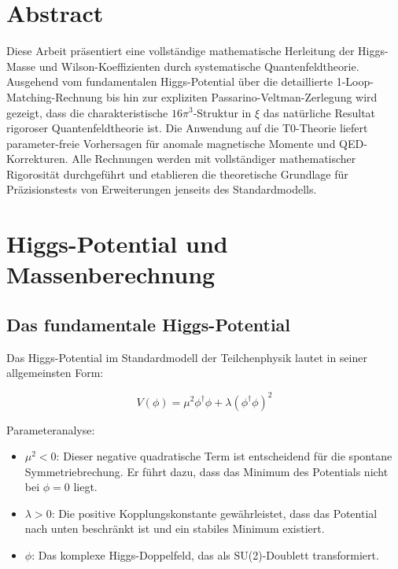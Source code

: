\section*{Abstract}
		Diese Arbeit präsentiert eine vollständige mathematische Herleitung der Higgs-Masse und Wilson-Koeffizienten durch systematische Quantenfeldtheorie. Ausgehend vom fundamentalen Higgs-Potential über die detaillierte 1-Loop-Matching-Rechnung bis hin zur expliziten Passarino-Veltman-Zerlegung wird gezeigt, dass die charakteristische $16\pi^3$-Struktur in $\xi$ das natürliche Resultat rigoroser Quantenfeldtheorie ist. Die Anwendung auf die T0-Theorie liefert parameter-freie Vorhersagen für anomale magnetische Momente und QED-Korrekturen. Alle Rechnungen werden mit vollständiger mathematischer Rigorosität durchgeführt und etablieren die theoretische Grundlage für Präzisionstests von Erweiterungen jenseits des Standardmodells.

	
	
	\section{Higgs-Potential und Massenberechnung}
	
	\subsection{Das fundamentale Higgs-Potential}
	
	Das Higgs-Potential im Standardmodell der Teilchenphysik lautet in seiner allgemeinsten Form:
	
	\begin{equation}
		V(\phi) = \mu^2 \phi^\dagger\phi + \lambda(\phi^\dagger\phi)^2
	\end{equation}
	
	\begin{wichtig}
		Parameteranalyse:
		\begin{itemize}
			\item $\mu^2 < 0$: Dieser negative quadratische Term ist entscheidend für die spontane Symmetriebrechung. Er führt dazu, dass das Minimum des Potentials nicht bei $\phi = 0$ liegt.
			\item $\lambda > 0$: Die positive Kopplungskonstante gewährleistet, dass das Potential nach unten beschränkt ist und ein stabiles Minimum existiert.
			\item $\phi$: Das komplexe Higgs-Doppelfeld, das als SU(2)-Doublett transformiert.
		\end{itemize}
	\end{wichtig}
	
